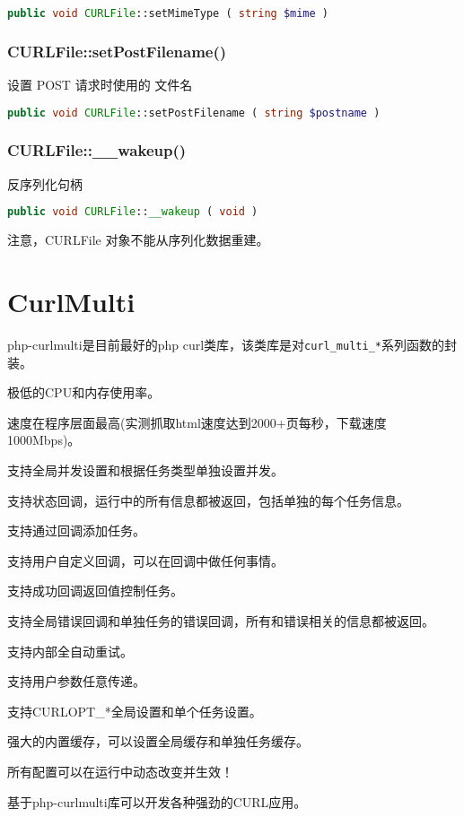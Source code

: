\begin{lstlisting}[language=PHP]
public void CURLFile::setMimeType ( string $mime )
\end{lstlisting}


\subsection{CURLFile::setPostFilename()}

设置 POST 请求时使用的 文件名

\begin{lstlisting}[language=PHP]
public void CURLFile::setPostFilename ( string $postname )
\end{lstlisting}



\subsection{CURLFile::\_\_wakeup()}

反序列化句柄

\begin{lstlisting}[language=PHP]
public void CURLFile::__wakeup ( void )
\end{lstlisting}

注意，CURLFile 对象不能从序列化数据重建。



\chapter{CurlMulti}

php-curlmulti是目前最好的php curl类库，该类库是对\texttt{curl\_multi\_*}系列函数的封装。


\begin{compactitem}
\item 极低的CPU和内存使用率。
\item 速度在程序层面最高(实测抓取html速度达到2000+页每秒，下载速度1000Mbps)。
\item 支持全局并发设置和根据任务类型单独设置并发。
\item 支持状态回调，运行中的所有信息都被返回，包括单独的每个任务信息。
\item 支持通过回调添加任务。
\item 支持用户自定义回调，可以在回调中做任何事情。
\item 支持成功回调返回值控制任务。
\item 支持全局错误回调和单独任务的错误回调，所有和错误相关的信息都被返回。
\item 支持内部全自动重试。
\item 支持用户参数任意传递。
\item 支持CURLOPT\_*全局设置和单个任务设置。
\item 强大的内置缓存，可以设置全局缓存和单独任务缓存。
\item 所有配置可以在运行中动态改变并生效！
\item 基于php-curlmulti库可以开发各种强劲的CURL应用。
\end{compactitem}



